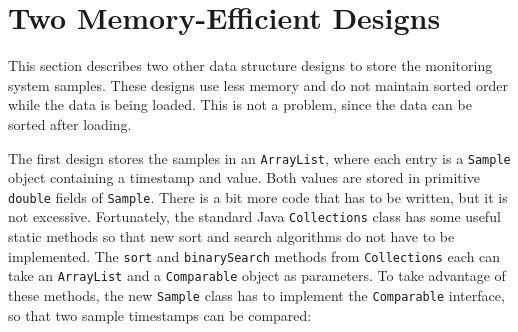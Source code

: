 \section{Two Memory-Efficient Designs}
\label{better-designs} 

This section describes two other data structure designs to store the monitoring system samples. These designs use less memory and do not maintain sorted order while the data is being loaded. This is not a problem, since the data can be sorted after loading. 

The first design stores the samples in an \texttt{ArrayList}, where each entry is a \texttt{Sample} object containing a timestamp and value. Both values are stored in primitive \texttt{double} fields of \texttt{Sample}.  There is a bit more code that has to be written, but it is not excessive. Fortunately, the standard Java \texttt{Collections} class has some useful static methods so that new sort and search algorithms do not have to be implemented. The \texttt{sort} and \texttt{binarySearch} methods from \texttt{Collections} each can take an \texttt{ArrayList} and a \texttt{Comparable} object as parameters. To take advantage of these methods, the new \texttt{Sample} class has to implement the \texttt{Comparable} interface, so that two sample timestamps can be compared:  

